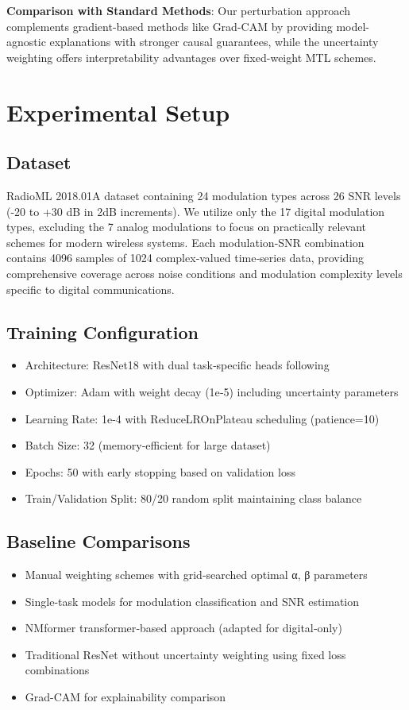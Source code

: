\documentclass{ELSP}
\begin{document}
\textbf{Comparison with Standard Methods}: Our perturbation approach complements gradient-based methods like Grad-CAM \cite{selvaraju2017grad} by providing model-agnostic explanations with stronger causal guarantees, while the uncertainty weighting offers interpretability advantages over fixed-weight MTL schemes.

\section{Experimental Setup}

\subsection{Dataset}
RadioML 2018.01A dataset containing 24 modulation types across 26 SNR levels (-20 to +30 dB in 2dB increments). We utilize only the 17 digital modulation types, excluding the 7 analog modulations to focus on practically relevant schemes for modern wireless systems. Each modulation‑SNR combination contains 4096 samples of 1024 complex‑valued time‑series data, providing comprehensive coverage across noise conditions and modulation complexity levels specific to digital communications.

\subsection{Training Configuration}
\begin{itemize}
\item Architecture: ResNet18 with dual task‑specific heads following \cite{kumar2023automatic}
\item Optimizer: Adam with weight decay (1e‑5) including uncertainty parameters
\item Learning Rate: 1e‑4 with ReduceLROnPlateau scheduling (patience=10)
\item Batch Size: 32 (memory‑efficient for large dataset)
\item Epochs: 50 with early stopping based on validation loss
\item Train/Validation Split: 80/20 random split maintaining class balance
\end{itemize}

\subsection{Baseline Comparisons}
\begin{itemize}
\item Manual weighting schemes with grid‑searched optimal α, β parameters
\item Single‑task models for modulation classification and SNR estimation
\item NMformer transformer‑based approach \cite{faysal2024nmformer} (adapted for digital‑only)
\item Traditional ResNet without uncertainty weighting using fixed loss combinations
\item Grad-CAM \cite{selvaraju2017grad} for explainability comparison
\end{itemize}
\end{document}
